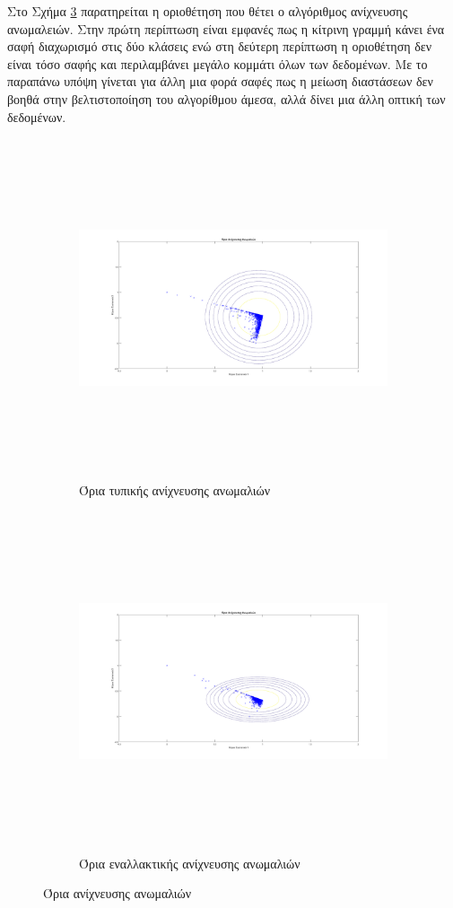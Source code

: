 Στο Σχήμα \ref{fig:viewandthreshold} παρατηρείται η οριοθέτηση που θέτει ο αλγόριθμος ανίχνευσης ανωμαλειών. Στην πρώτη περίπτωση είναι εμφανές πως η κίτρινη γραμμή κάνει ένα σαφή διαχωρισμό στις δύο κλάσεις ενώ στη δεύτερη περίπτωση η οριοθέτηση δεν είναι τόσο σαφής και περιλαμβάνει μεγάλο κομμάτι όλων των δεδομένων. Με το παραπάνω υπόψη γίνεται για άλλη μια φορά σαφές πως η μείωση διαστάσεων δεν βοηθά στην βελτιστοποίηση του αλγορίθμου άμεσα, αλλά δίνει μια άλλη οπτική των δεδομένων.
\begin{figure}[ht!]
\begin{subfigure}[b]{0.4\textwidth}
\includegraphics[width=160mm, height=100mm]{../../plots/gr_threshold_semi_sup_1.png}
\caption{Όρια τυπικής ανίχνευσης ανωμαλιών}
\label{fig:threshanomalydetection1}
\end{subfigure}

\begin{subfigure}[b]{0.4\textwidth}
\includegraphics[width=160mm, height=100mm]{../../plots/gr_threshold_semi_sup_2.png}
\caption{Όρια εναλλακτικής ανίχνευσης ανωμαλιών}
\label{fig:threshanomalydetection2}
\end{subfigure}

\caption{Όρια ανίχνευσης ανωμαλιών}
\label{fig:viewandthreshold}
\end{figure}

